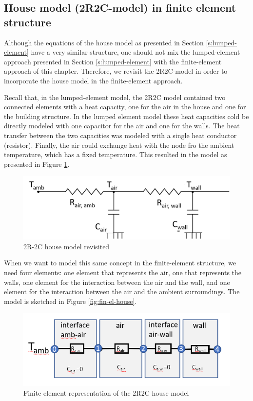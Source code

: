 \subsection{House model (2R2C-model) in finite element structure}

Although the equations of the house model as presented in Section \ref{s:lumped-element} have a very similar structure, one should not mix the lumped-element approach presented in Section \ref{s:lumped-element} with the finite-element approach of this chapter. Therefore, we revisit the 2R2C-model in order to incorporate the house model in the finite-element approach. 

Recall that, in the lumped-element model, the 2R2C model contained two connected elements with a heat capacity, one for the air in the house and one for the building structure. In the lumped element model these heat capacities cold be directly modeled with one capacitor for the air and one for the walls. The heat transfer between the two capacities was modeled with a single heat conductor (resistor). Finally, the air could exchange heat with the node fro the ambient temperature, which has a fixed temperature. This resulted in the model as presented in Figure \ref{fig:2R2Cagain}. 
\begin{figure}[H]
	\centering
	\includegraphics[width=0.7\columnwidth]{Pictures/2R2Cmodel_rev.png}
	\caption[Short title]{2R-2C house model revisited}
	\label{fig:2R2Cagain}
\end{figure}

When we want to model this same concept in the finite-element structure, we need four elements: one element that represents the air, one that represents the walls, one element for the interaction between the air and the wall, and one element for the interaction between the air and the ambient surroundings. The model is sketched in Figure \ref{fig:fin-el-house}.
\begin{figure}[H]
	\centering
	\includegraphics[width=0.7\columnwidth]{Pictures/finite_element_house.png}
	\caption[Short title]{Finite element representation of the 2R2C house model}
	\label{fig:fin-elhouse}
\end{figure}

